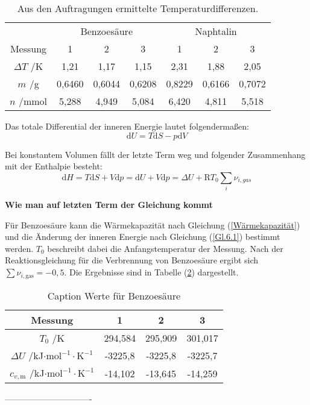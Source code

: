 \documentclass[12pt,a4paper,titlepage,headinclude,bibtotoc]{scrartcl}
\begin{document}
\begin{table} \label{TabDeltaT}\caption{Aus den Auftragungen ermittelte Temperaturdifferenzen.}
\begin{tabular}{c|c|c|c|c|c|c}
&\multicolumn{3}{c|}{Benzoesäure} & \multicolumn{3}{c}{Naphtalin}\\ 
Messung& 1&2&3&1&2&3\\
\hline 
$\Delta T$ /K & 1,21 & 1,17 & 1,15 & 2,31 & 1,88 & 2,05 \\ 
$m$ /g&0,6460&0,6044&0,6208&0,8229&0,6166&0,7072\\
$n$ /mmol& 5,288&4,949&5,084&6,420&4,811&5,518\\
\end{tabular} 
\end{table}
\FloatBarrier

Das totale Differential der inneren Energie lautet folgendermaßen:\\

\begin{equation}
\mathrm{d}U= T\mathrm{d}S - p\mathrm{d}V
\end{equation} 

Bei konstantem Volumen fällt der letzte Term weg und folgender Zusammenhang mit der Enthalpie besteht:\\

\begin{equation} \label{Gl.6.1}
\mathrm{d}H= T\mathrm{d}S + V\mathrm{d}p = \mathrm{d}U + V\mathrm{d}p = \Delta U +\mathrm{R}T_0\sum_i \nu_{i,gas}
\end{equation}

\textbf{Wie man auf letzten Term der Gleichung kommt}

Für Benzoesäure kann die Wärmekapazität nach Gleichung (\ref{Wärmekapazität}) und die Änderung der inneren Energie nach Gleichung (\ref{Gl.6.1}) bestimmt werden. $T_0$ beschreibt dabei die Anfangstemperatur der Messung. Nach der Reaktionsgleichung für die Verbrennung von Benzoesäure ergibt sich $\sum \nu_{i,\mathrm{gas}}= -0,5$. Die Ergebnisse sind in Tabelle (\ref{TabDeltaT}) dargestellt.\\

\begin{table} \label{TabDeltaT}\caption{Caption Werte für Benzoesäure}
\begin{tabular}{c|c|c|c}
Messung& 1&2&3\\
\hline 
$T_0$ /K&294,584&295,909&301,017\\
$\Delta U$ /kJ$\cdot \mathrm{mol}^{-1} \cdot \mathrm{K}^{-1}$&
-3225,8&-3225,8&-3225,7\\
$c_{v,\mathrm{m}}$ /kJ$\cdot \mathrm{mol}^{-1} \cdot \mathrm{K}^{-1}$&-14,102&-13,645&-14,259\\
\end{tabular} 
\end{table}
\FloatBarrier
-------------------------------\\
\end{document}
